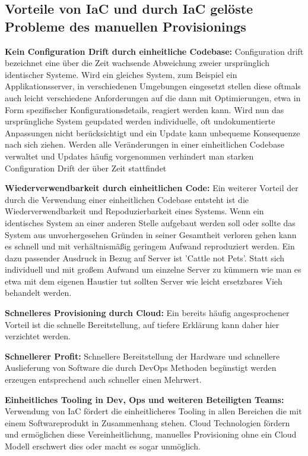 \begin{spacing}{1.2}
\subsection{Vorteile von IaC und durch IaC gelöste Probleme des
manuellen Provisionings}

\textbf{Kein Configuration Drift durch einheitliche Codebase:}
Configuration drift bezeichnet eine über die Zeit
wachsende Abweichung zweier ursprünglich identischer Systeme. Wird ein
gleiches System, zum Beispiel ein Applikationsserver, in verschiedenen
Umgebungen eingesetzt stellen diese oftmals auch leicht verschiedene
Anforderungen auf die dann mit Optimierungen, etwa in Form spezifischer
Konfigurationsdetails, reagiert werden kann. Wird nun das ursprüngliche
System geupdated werden individuelle, oft undokumentierte Anpassungen
nicht berücksichtigt und ein Update kann unbequeme Konsequenze nach
sich ziehen. Werden alle Veränderungen in einer einheitlichen
Codebase verwaltet und Updates häufig vorgenommen verhindert man
starken Configuration Drift der über Zeit stattfindet

\textbf{Wiederverwendbarkeit durch einheitlichen Code:}
Ein weiterer Vorteil der durch die Verwendung einer einheitlichen
Codebase entsteht ist die Wiederverwendbarkeit und Repoduzierbarkeit
eines Systems. Wenn ein identisches System an einer anderen Stelle
aufgebaut werden soll oder sollte das System aus unvorhergesehen
Gründen in seiner Gesamtheit verloren gehen kann es schnell und mit
verhältnismäßig geringem Aufwand reproduziert werden.
Ein dazu passender Ausdruck in Bezug auf Server ist 'Cattle not Pets'.
Statt sich individuell und mit großem Aufwand um einzelne Server zu
kümmern wie man es etwa mit dem eigenen Haustier tut sollten Server
wie leicht ersetzbares Vieh behandelt werden.

\textbf{Schnelleres Provisioning durch Cloud:} Ein bereits häufig
angesprochener Vorteil ist die schnelle Bereitstellung, auf tiefere
Erklärung kann daher hier verzichtet werden.

\textbf{Schnellerer Profit:} Schnellere Bereitstellung der Hardware
und schnellere Auslieferung von Software die durch DevOps Methoden
begünstigt werden erzeugen entsprechend auch schneller einen Mehrwert.

\textbf{Einheitliches Tooling in Dev, Ops und weiteren Beteiligten Teams:}
Verwendung von IaC
fördert die einheitlicheres Tooling in allen Bereichen die mit einem
Softwareprodukt in Zusammenhang stehen. Cloud Technologien fördern und
ermöglichen diese Vereinheitlichung, manuelles Provisioning ohne ein
Cloud Modell erschwert dies oder macht es sogar unmöglich.


\end{spacing}
